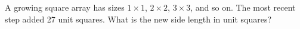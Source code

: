 A growing square array has sizes $1\times 1$, $2\times 2$, $3\times 3$, and so on. The most recent step added 27 unit squares. What is the new side length in unit squares?
